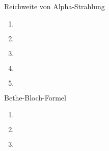 \documentclass{alex_hü}
\begin{document}
\renewcommand{\labelenumi}{\alph{enumi})}


\begin{mybox}{Reichweite von Alpha-Strahlung}
	\centering \(  \)
	\tcblower
	\begin{enumerate}
		\item \(  \)
%			
	\tcbline
		\item \(  \)
%		
	\tcbline
		\item \(  \)
%			
	\tcbline
		\item \(  \)
%			
	\tcbline
		\item \(  \)
%			
	\end{enumerate}
\end{mybox}

\begin{mybox}{Bethe-Bloch-Formel}
	\centering \(  \)
	\tcblower
	\begin{enumerate}
		\item \(  \)
	\tcbline
		\item \(  \)
	\tcbline
		\item \(  \)
	\end{enumerate}
\end{mybox}
\end{document}
